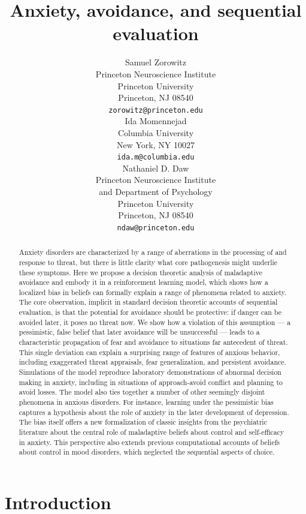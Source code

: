 \documentclass[11pt]{article} %
\title{Anxiety, avoidance, and sequential evaluation}
\author{
Samuel Zorowitz \\
Princeton Neuroscience Institute\\
Princeton University\\
Princeton, NJ 08540 \\
\texttt{zorowitz@princeton.edu} \\
\And
Ida Momennejad \\
Columbia University\\
New York, NY 10027 \\
\texttt{ida.m@columbia.edu} \\
\And
Nathaniel D. Daw \\
Princeton Neuroscience Institute\\
and Department of Psychology\\
Princeton University\\
Princeton, NJ 08540 \\
\texttt{ndaw@princeton.edu} \\
}
\begin{document}
\maketitle

\begin{abstract}
Anxiety disorders are characterized by a range of aberrations in the processing of and response to threat, but there is little clarity what core pathogenesis might underlie these symptoms. Here we propose a decision theoretic analysis of maladaptive avoidance and embody it in a reinforcement learning model, which shows how a localized bias in beliefs can formally explain a range of phenomena related to anxiety. The core observation, implicit in standard decision theoretic accounts of sequential evaluation, is that the potential for avoidance should be protective: if danger can be avoided later, it poses no threat now. We show how a violation of this assumption --- a pessimistic, false belief that later avoidance will be unsuccessful --- leads to a characteristic propagation of fear and avoidance to situations far antecedent of threat. This single deviation can explain a surprising range of features of anxious behavior, including exaggerated threat appraisals, fear generalization, and persistent avoidance. Simulations of the model reproduce laboratory demonstrations of abnormal decision making in anxiety, including in situations of approach-avoid conflict and planning to avoid losses. The model also ties together a number of other seemingly disjoint phenomena in anxious disorders. For instance, learning under the pessimistic bias captures a hypothesis about the role of anxiety in the later development of depression. The bias itself offers a new formalization of classic insights from the psychiatric literature about the central role of maladaptive beliefs about control and self-efficacy in anxiety. This perspective also extends previous computational accounts of beliefs about control in mood disorders, which neglected the sequential aspects of choice.
\end{abstract}



\startmain

\section{Introduction}
\end{document}
